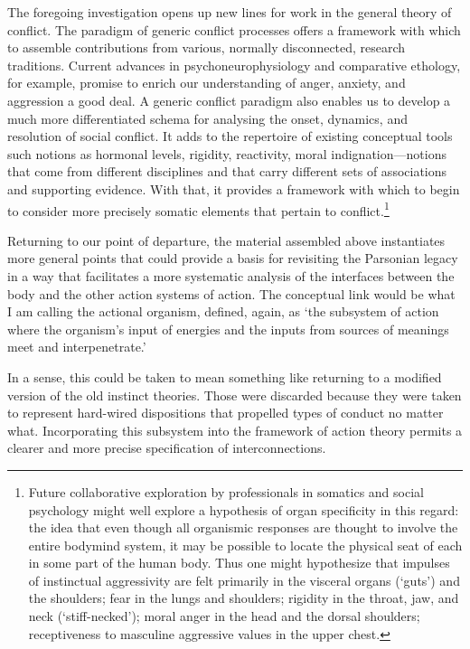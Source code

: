 The foregoing investigation opens up new lines for work in the general theory of conflict. The paradigm of generic conflict processes offers a framework with which to assemble contributions from various, normally disconnected, research traditions. Current advances in psychoneurophysiology and comparative ethology, for example, promise to enrich our understanding of anger, anxiety, and aggression a good deal. A generic conflict paradigm also enables us to develop a much more differentiated schema for analysing the onset, dynamics, and resolution of social conflict. It adds to the repertoire of existing conceptual tools such notions as hormonal levels, rigidity, reactivity, moral indignation---notions that come from different disciplines and that carry different sets of associations and supporting evidence. With that, it provides a framework with which to begin to consider more precisely somatic elements that pertain to conflict.\footnote{Future collaborative exploration by professionals in somatics and social psychology might well explore a hypothesis of organ specificity in this regard: the idea that even though all organismic responses are thought to involve the entire bodymind system, it may be possible to locate the physical seat of each in some part of the human body. Thus one might hypothesize that impulses of instinctual aggressivity are felt primarily in the visceral organs (`guts') and the shoulders; fear in the lungs and shoulders; rigidity in the throat, jaw, and neck (`stiff-necked'); moral anger in the head and the dorsal shoulders; receptiveness to masculine aggressive values in the upper chest.}

Returning to our point of departure, the material assembled above instantiates more general points that could provide a basis for revisiting the Parsonian legacy in a way that facilitates a more systematic analysis of the interfaces between the body and the other action systems of action. The conceptual link would be what I am calling the actional organism, defined, again, as `the subsystem of action where the organism's input of energies and the inputs from sources of meanings meet and interpenetrate.'

In a sense, this could be taken to mean something like returning to a modified version of the old instinct theories. Those were discarded because they were taken to represent hard-wired dispositions that propelled types of conduct no matter what. Incorporating this subsystem into the framework of action theory permits a clearer and more precise specification of interconnections.

